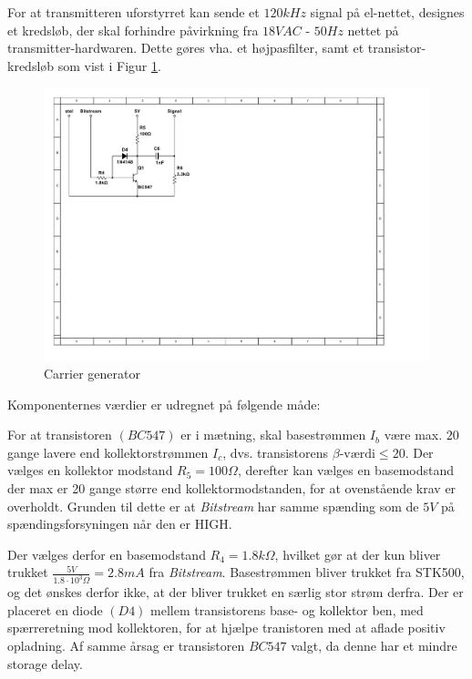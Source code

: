 For at transmitteren uforstyrret kan sende et $120kHz$ signal på el-nettet, designes et kredsløb, der skal forhindre påvirkning fra $18VAC$ - $ 50Hz$ nettet på transmitter-hardwaren. Dette gøres vha. et  højpasfilter, samt et transistor-kredsløb som vist i Figur \ref{fig:CarrierGenDesign}.

\begin{figure}[h]
	\centering
	\includegraphics[scale=0.8, trim=45 355 525 45, clip=true]{../HardwareDesign/Diagrammer/CarrierGenerator.pdf}
	\caption{Carrier generator}
	\label{fig:CarrierGenDesign}
\end{figure}

Komponenternes værdier er udregnet på følgende måde:

For at transistoren $(BC547)$\cite{lib:BC547} er i mætning, skal basestrømmen $I_{b}$ være max. $20$ gange lavere end kollektorstrømmen $I_{c}$, dvs. transistorens $\beta\text{-værdi} \leq 20$. Der vælges en kollektor modstand $R_{5}=100\Omega$, derefter kan vælges en basemodstand der max er 20 gange større end kollektormodstanden, for at ovenstående krav er overholdt. Grunden til dette er at \textit{Bitstream} har samme spænding som de $5V$ på spændingsforsyningen når den er HIGH.

Der vælges derfor en basemodstand $R_{4}=1.8k\Omega$, hvilket gør at der kun bliver trukket $\tfrac{5V}{1.8 \cdot 10^{3}\Omega}=2.8mA$ fra \textit{Bitstream}. Basestrømmen bliver trukket fra STK500, og det ønskes derfor ikke, at der bliver trukket en særlig stor strøm derfra. Der er placeret en diode $(D4)$ mellem transistorens base- og kollektor ben, med spærreretning mod kollektoren, for at hjælpe tranistoren med at aflade positiv opladning. Af samme årsag er transistoren $BC547$ valgt, da denne har et mindre storage delay.

